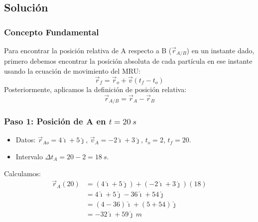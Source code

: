 \documentclass[12pt, a4paper]{article}
\begin{document}
\begin{center}
\end{center}

\subsection*{Solución}

\subsubsection*{Concepto Fundamental}
Para encontrar la posición relativa de A respecto a B ($\vec{r}_{A/B}$) en un instante dado, primero debemos encontrar la posición absoluta de cada partícula en ese instante usando la ecuación de movimiento del MRU:
\begin{equation}
    \vec{r}_f = \vec{r}_o + \vec{v}(t_f - t_o)
\end{equation}
Posteriormente, aplicamos la definición de posición relativa:
\begin{equation}
    \vec{r}_{A/B} = \vec{r}_A - \vec{r}_B
\end{equation}

\subsubsection*{Paso 1: Posición de A en $t = \SI{20}{s}$}
\begin{itemize}
    \item Datos: $\vec{r}_{Ao} = 4\hat{\imath} + 5\hat{\jmath}$, $\vec{v}_A = -2\hat{\imath} + 3\hat{\jmath}$, $t_o = 2$, $t_f = 20$.
    \item Intervalo $\Delta t_A = 20 - 2 = \SI{18}{s}$.
\end{itemize}
Calculamos:
\begin{align*}
    \vec{r}_A(20) &= (4\hat{\imath} + 5\hat{\jmath}) + (-2\hat{\imath} + 3\hat{\jmath})(18) \\
    &= 4\hat{\imath} + 5\hat{\jmath} - 36\hat{\imath} + 54\hat{\jmath} \\
    &= (4 - 36)\hat{\imath} + (5 + 54)\hat{\jmath} \\
    &= -32\hat{\imath} + 59\hat{\jmath} \, \si{m}
\end{align*}
\end{document}
